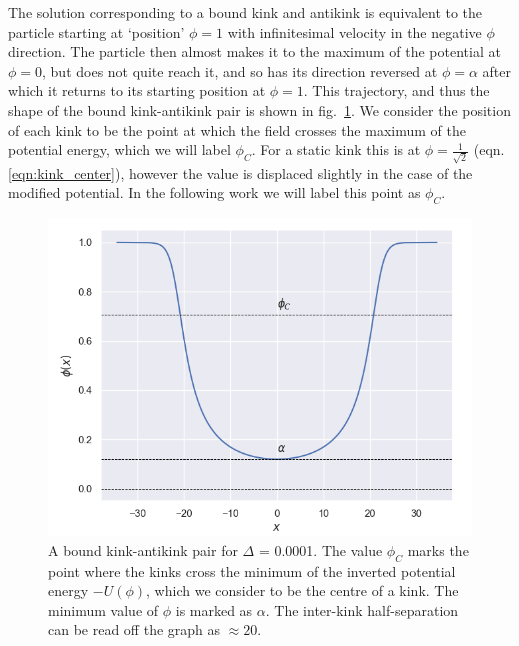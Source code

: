 \documentclass[11pt, oneside]{article}  	%
\numberwithin{equation}{section}
\begin{document}
The solution corresponding to a bound kink and antikink is equivalent to the particle starting at `position' $\phi = 1$ with infinitesimal velocity in the negative $\phi$ direction. The particle then almost makes it to the maximum of the potential at $\phi = 0$, but does not quite reach it, and so has its direction reversed at $\phi = \alpha$ after which it returns to its starting position at $\phi = 1$. This trajectory, and thus the shape of the bound kink-antikink pair is shown in fig.~\ref{fig:kink_antikink_pair}. We consider the position of each kink to be the point at which the field crosses the maximum of the potential energy, which we will label $\phi_C$. For a static kink this is at $\phi = \frac{1}{\sqrt{2}}$ (eqn. \ref{eqn:kink_center}), however the value is displaced slightly in the case of the modified potential. In the following work we will label this point as $\phi_C$.\par
\begin{figure}[t]
    \centering
    \includegraphics[width=0.4\columnwidth]{kink_antikink_pair}
    \caption{A bound kink-antikink pair for $\Delta$ = 0.0001. The value $\phi_C$ marks the point where the kinks cross the minimum of the inverted potential energy $-U(\phi)$, which we consider to be the centre of a kink. The minimum value of $\phi$ is marked as $\alpha$. The inter-kink half-separation can be read off the graph as $\approx 20$.} 
    \label{fig:kink_antikink_pair}
\end{figure}
\end{document}

